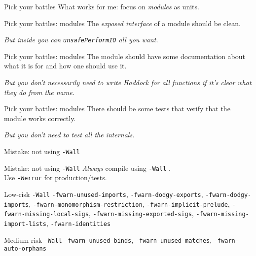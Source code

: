 \documentclass[20pt]{beamer}
\newcommand{\vspaced}{
    \vspace{5mm}
}
\newcommand{\chapterslide}[1]{
    {
        \begin{frame}[plain]
        \begin{center}
        \large{#1}
        \end{center}
        \end{frame}
    }
}
\newcommand{\code}[1]{
    \texttt{\small{#1}}
}
\begin{document}
\begin{frame}{Pick your battles}
    What works for me: focus on \emph{modules} as units.
\end{frame}

\begin{frame}{Pick your battles: modules}
    The \emph{exposed interface} of a module should be clean. \\
    \vspaced
    \emph{\small{But inside you can \code{unsafePerformIO} all you want.}}
\end{frame}

\begin{frame}{Pick your battles: modules}
    The module should have some documentation about what it is for and how one
    should use it. \\
    \vspaced
    \emph{\small{But you don't necessarily need to write Haddock for all
    functions if it's clear what they do from the name.}}
\end{frame}

\begin{frame}{Pick your battles: modules}
    There should be some tests that verify that the module works correctly. \\
    \vspaced
    \emph{\small{But you don't need to test all the internals.}}
\end{frame}


\chapterslide{Mistake: not using \code{-Wall}}

\begin{frame}{Mistake: not using \code{-Wall}}
    \emph{Always} compile using \code{-Wall}. \\
    Use \code{-Werror} for production/tests.
\end{frame}

\begin{frame}{Low-risk \code{-Wall}}
    \small{
    \texttt{-fwarn-unused-imports},
    \texttt{-fwarn-dodgy-exports},
    \texttt{-fwarn-dodgy-imports},
    \texttt{-fwarn-monomorphism-restriction},
    \texttt{-fwarn-implicit-prelude},
    \texttt{-fwarn-missing-local-sigs},
    \texttt{-fwarn-missing-exported-sigs},
    \texttt{-fwarn-missing-import-lists},
    \texttt{-fwarn-identities}
    }
\end{frame}

\begin{frame}{Medium-risk \code{-Wall}}
    \small{
    \texttt{-fwarn-unused-binds},
    \texttt{-fwarn-unused-matches},
    \texttt{-fwarn-auto-orphans}
    }
\end{frame}
\end{document}
